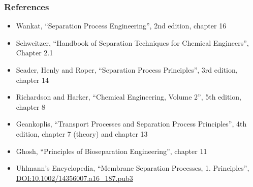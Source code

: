 \begin{frame}\frametitle{References}
	\begin{itemize}
		\item	Wankat, ``Separation Process Engineering'', 2nd edition, chapter 16
		\item	Schweitzer, ``Handbook of Separation Techniques for Chemical Engineers'', Chapter 2.1 %
		\item	Seader, Henly and Roper, ``Separation Process Principles'', 3rd edition, chapter 14
		\item	Richardson and Harker, ``Chemical Engineering, Volume 2'', 5th edition, chapter 8
		\item	Geankoplis, ``Transport Processes and Separation Process Principles'', 4th edition, chapter 7 (theory) and chapter 13
		\item	Ghosh, ``Principles of Bioseparation Engineering'', chapter 11 
		\item	Uhlmann's Encyclopedia, ``Membrane Separation Processes, 1. Principles'',  \href{http://dx.doi.org/10.1002/14356007.a16_187.pub3}{DOI:10.1002/14356007.a16\_187.pub3}
	\end{itemize}
\end{frame}

